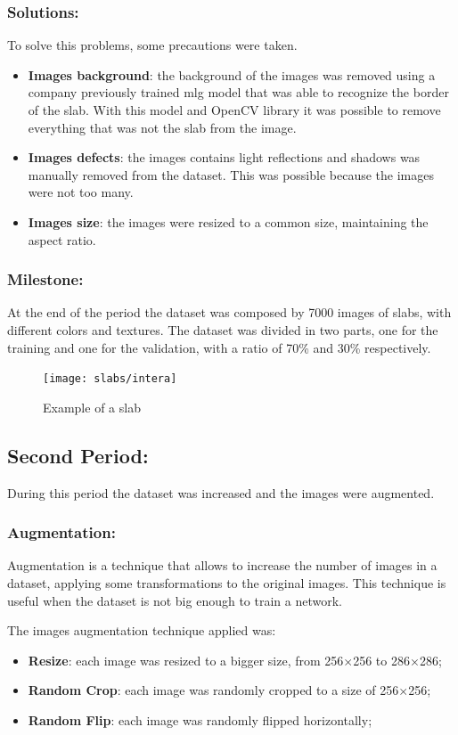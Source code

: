 \subsubsection{Solutions:}
To solve this problems, some precautions were taken.
\begin{itemize}
    \item \textbf{Images background}: the background of the images was removed using a company previously trained \gls{mlg} model that was able to recognize the border of the slab.
                              With this model and OpenCV library it was possible to remove everything that was not the slab from the image.
    \item \textbf{Images defects}: the images contains light reflections and shadows was manually removed from the dataset.
                                   This was possible because the images were not too many.
    \item \textbf{Images size}: the images were resized to a common size, maintaining the aspect ratio.
\end{itemize}
\subsubsection{Milestone:}
At the end of the period the dataset was composed by 7000 images of slabs, with different colors and textures.
The dataset was divided in two parts, one for the training and one for the validation, with a ratio of 70\% and 30\% respectively.
\begin{figure}
    \centering
    \texttt{[image: slabs/intera]}
    \caption{Example of a slab}
\end{figure}
\subsection{Second Period:}
During this period the dataset was increased and the images were augmented.
\subsubsection{Augmentation:}
Augmentation is a technique that allows to increase the number of images in a dataset, applying some transformations to the original images.
This technique is useful when the dataset is not big enough to train a network.

The images augmentation technique applied was:
\begin{itemize}
    \item  \textbf{Resize}: each image was resized to a bigger size, from 256$\times$256 to 286$\times$286;
    \item  \textbf{Random Crop}: each image was randomly cropped to a size of 256$\times$256;
    \item  \textbf{Random Flip}: each image was randomly flipped horizontally;
\end{itemize}


